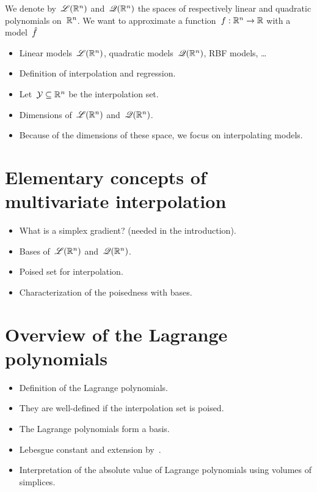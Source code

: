 We denote by~$\mathscr{L}(\mathbb{R}^n)$ and~$\mathscr{Q}(\mathbb{R}^n)$ the spaces of respectively linear and quadratic polynomials on~$\mathbb{R}^n$.
We want to approximate a function~$f : \mathbb{R}^n \to \mathbb{R}$ with a model~$\objm$

\begin{itemize}
    \item Linear models~$\mathscr{L}(\mathbb{R}^n)$, quadratic models~$\mathscr{Q}(\mathbb{R}^n)$, RBF models, \dots
    \item Definition of interpolation and regression.
    \item Let~$\mathcal{Y} \subseteq \mathbb{R}^n$ be the interpolation set.
    \item Dimensions of~$\mathscr{L}(\mathbb{R}^n)$ and~$\mathscr{Q}(\mathbb{R}^n)$.
    \item Because of the dimensions of these space, we focus on interpolating models.
\end{itemize}

\section{Elementary concepts of multivariate interpolation}
\label{sec:multivariate-interpolation}

\begin{itemize}
    \item What is a simplex gradient? (needed in the introduction).
    \item Bases of~$\mathscr{L}(\mathbb{R}^n)$ and~$\mathscr{Q}(\mathbb{R}^n)$.
    \item Poised set for interpolation.
    \item Characterization of the poisedness with bases.
\end{itemize}

\section{Overview of the Lagrange polynomials}

\begin{itemize}
    \item Definition of the Lagrange polynomials.
    \item They are well-defined if the interpolation set is poised.
    \item The Lagrange polynomials form a basis.
    \item Lebesgue constant and extension by~\cite{Ciarlet_Raviart_1972}.
    \item Interpretation of the absolute value of Lagrange polynomials using volumes of simplices.
\end{itemize}

